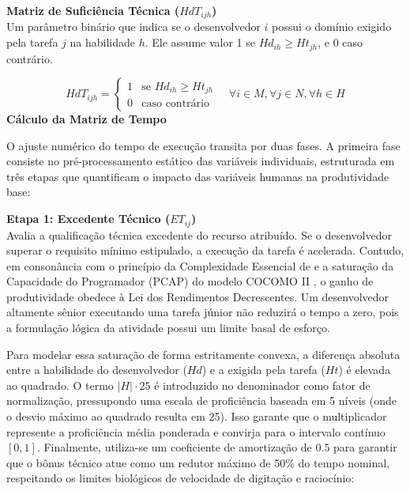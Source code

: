 \documentclass[a4paper,11pt]{article}
\begin{document}
\vspace{0.2cm}
\noindent\textbf{Matriz de Suficiência Técnica ($HdT_{ijh}$)} \\
Um parâmetro binário que indica se o desenvolvedor $i$ possui o domínio exigido 
pela tarefa $j$ na habilidade $h$. Ele assume valor 1 se $Hd_{ih} \ge Ht_{jh}$, 
e 0 caso contrário.

\begin{equation}
    HdT_{ijh} = 
    \begin{cases} 
      1 & \text{se } Hd_{ih} \ge Ht_{jh} \\
      0 & \text{caso contrário}
    \end{cases}
    \quad \forall i \in M, \forall j \in N, \forall h \in H
\end{equation}
\noindent\textbf{Cálculo da Matriz de Tempo}

O ajuste numérico do tempo de execução transita por duas fases. A primeira 
fase consiste no pré-processamento estático das variáveis individuais, 
estruturada em três etapas que quantificam o impacto das variáveis humanas 
na produtividade base:

\vspace{0.2cm}
\noindent\textbf{Etapa 1: Excedente Técnico ($ET_{ij}$)} \\
Avalia a qualificação técnica excedente do recurso atribuído. Se o desenvolvedor superar o requisito mínimo estipulado, a execução da tarefa é acelerada. Contudo, em consonância com o princípio da Complexidade Essencial de \citet{brooks1987} e a saturação da Capacidade do Programador (PCAP) do modelo COCOMO II \citep{boehm2000}, o ganho de produtividade obedece à Lei dos Rendimentos Decrescentes. Um desenvolvedor altamente sênior executando uma tarefa júnior não reduzirá o tempo a zero, pois a formulação lógica da atividade possui um limite basal de esforço.

Para modelar essa saturação de forma estritamente convexa, a diferença absoluta entre a habilidade do desenvolvedor ($Hd$) e a exigida pela tarefa ($Ht$) é elevada ao quadrado. O termo $|H| \cdot 25$ é introduzido no denominador como fator de normalização, pressupondo uma escala de proficiência baseada em 5 níveis (onde o desvio máximo ao quadrado resulta em 25). Isso garante que o multiplicador represente a proficiência média ponderada e convirja para o intervalo contínuo $[0, 1]$. Finalmente, utiliza-se um coeficiente de amortização de $0.5$ para garantir que o bônus técnico atue como um redutor máximo de 50\% do tempo nominal, respeitando os limites biológicos de velocidade de digitação e raciocínio:
\end{document}
